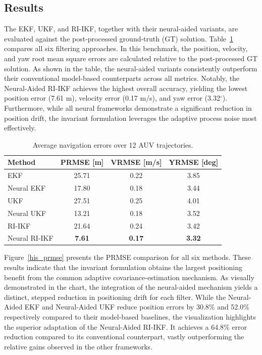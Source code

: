 \documentclass[conference]{IEEEtran}
\begin{document}
\subsection{Results}
\noindent The EKF, UKF, and RI-IKF, together with their neural-aided variants, are evaluated against the post-processed ground-truth (GT) solution. Table~\ref{tab:filter_results} compares all six filtering approaches. In this benchmark, the position, velocity, and yaw root mean square errors are calculated relative to the post-processed GT solution. As shown in the table, the neural-aided variants consistently outperform their conventional model-based counterparts across all metrics. Notably, the Neural-Aided RI-IKF achieves the highest overall accuracy, yielding the lowest position error (7.61 m), velocity error (0.17 m/s), and yaw error (3.32$^\circ$). Furthermore, while all neural frameworks demonstrate a significant reduction in position drift, the invariant formulation leverages the adaptive process noise most effectively.
\begin{table}[h!]
\centering
\caption{Average navigation errors over 12 AUV trajectories.}
\begin{tabular}{|l|c|c|c|}
\hline
\textbf{Method} & \textbf{PRMSE [m]} & \textbf{VRMSE [m/s]} & \textbf{YRMSE [deg]} \\
\hline
EKF & 25.71 & 0.22 & 3.85 \\
\hline
Neural EKF & 17.80 & 0.18 & 3.44 \\
\hline
UKF & 27.51 & 0.25 & 4.01 \\
\hline
Neural UKF & 13.21 & 0.18 & 3.52 \\
\hline
RI-IKF & 21.64 & 0.24 & 3.42 \\
\hline
Neural RI-IKF & \textbf{7.61} & \textbf{0.17} & \textbf{3.32} \\
\hline
\end{tabular}
\label{tab:filter_results}
\end{table}
\noindent Figure~\ref{his_prmse} presents the PRMSE comparison for all six methods. These results indicate that the invariant formulation obtains the largest positioning benefit from the common adaptive covariance-estimation mechanism. As visually demonstrated in the chart, the integration of the neural-aided mechanism yields a distinct, stepped reduction in positioning drift for each filter. While the Neural-Aided EKF and Neural-Aided UKF reduce position errors by 30.8\% and 52.0\% respectively compared to their model-based baselines, the visualization highlights the superior adaptation of the Neural-Aided RI-IKF. It achieves a 64.8\% error reduction compared to its conventional counterpart, vastly outperforming the relative gains observed in the other frameworks. 
\end{document}
